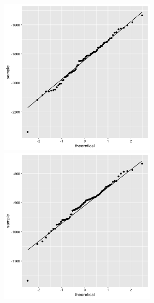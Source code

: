 \begin{enumerate}
\begin{center}
	\includegraphics[width=3.0in]{8_22_S_qq.png}
	\includegraphics[width=3.0in]{8_22_R_qq.png}
\end{center}

\end{enumerate}



